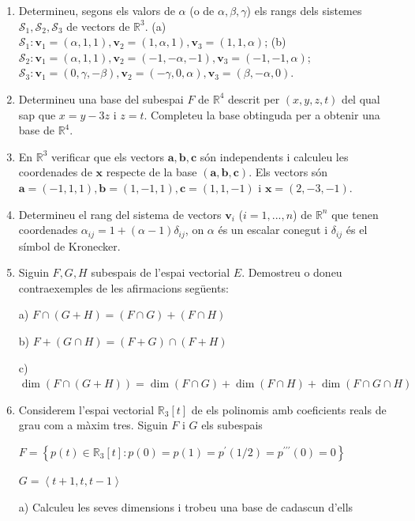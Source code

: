 \begin{enumerate}
\item Determineu, segons els valors de $\alpha $ (o de $\alpha ,\beta
,\gamma $) els rangs dels sistemes $\mathcal{S}_{1},\mathcal{S}_{2},%
\mathcal{S}_{3}$ de vectors de $\mathbb{R}^{3}$. (a) $\mathcal{S}_{1}:%
\mathbf{v}_{1}=(\alpha ,1,1),\mathbf{v}_{2}=(1,\alpha ,1),\mathbf{v}%
_{3}=(1,1,\alpha )$; (b) $\mathcal{S}_{2}:\mathbf{v}_{1}=(\alpha ,1,1),%
\mathbf{v}_{2}=(-1,-\alpha ,-1),\mathbf{v}_{3}=(-1,-1,\alpha )$; $\mathcal{S}%
_{3}:\mathbf{v}_{1}=(0,\gamma ,-\beta ),\mathbf{v}_{2}=(-\gamma ,0,\alpha ),%
\mathbf{v}_{3}=(\beta ,-\alpha ,0)$.

\item Determineu una base del subespai $F$ de $\mathbb{R}^{4}$
descrit per $(x,y,z,t)$ del qual sap que $x=y-3z$ i $z=t$. Completeu la
base obtinguda per a obtenir una base de $\mathbb{R}^{4}$.

\item En $\mathbb{R}^{3}$ verificar que els vectors $\mathbf{a},\mathbf{b},%
\mathbf{c}$ són independents i calculeu les coordenades de $\mathbf{x}$
respecte de la base $(\mathbf{a},\mathbf{b},\mathbf{c})$. Els vectors són $%
\mathbf{a}=(-1,1,1),\mathbf{b}=(1,-1,1),\mathbf{c}=(1,1,-1)$ i $\mathbf{x}%
=(2,-3,-1)$.

\item Determineu el rang del sistema de vectors $\mathbf{v}_{i}$ ($%
i=1,...,n$) de $\mathbb{R}^{n}$ que tenen coordenades $\alpha
_{ij}=1+(\alpha -1)\delta _{ij}$, on $\alpha $ és un escalar conegut
i $\delta _{ij}$ és el símbol de Kronecker.

\item Siguin $F,G,H$ subespais de l’espai vectorial $E$. Demostreu o doneu
contraexemples de les afirmacions següents:

a) $F\cap (G+H)=(F\cap G)+(F\cap H)$

b) $F+(G\cap H)=(F+G)\cap (F+H)$

c) $\dim (F\cap (G+H))=\dim (F\cap G)+\dim (F\cap H)+\dim (F\cap G\cap H)$

\item Considerem l’espai vectorial $\mathbb{R}_{3}\left[ t\right] $ de
els polinomis amb coeficients reals de grau com a màxim tres. Siguin $F$ i $G
$ els subespais

$F=\left\{ p(t)\in \mathbb{R}_{3}\left[ t\right] :p(0)=p(1)=p^{\prime
}(1/2)=p^{\prime \prime \prime }(0)=0\right\} $

$G=\left\langle t+1,t,t-1\right\rangle $

a) Calculeu les seves dimensions i trobeu una base de cadascun d'ells


\end{enumerate}
